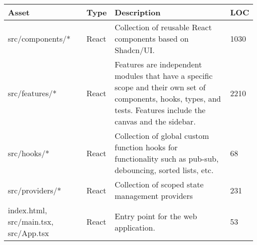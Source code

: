 \begin{table}[h]
    \centering


    \begin{tabular}{|p{5cm}|p{1.5cm}|p{6cm}|p{1cm}|}
        \hline
        \rowcolor{white} %
        \textbf{Asset}                        & \textbf{Type} & \textbf{Description}                                                                                                                                               & \textbf{LOC} \\
        \hline
        \rowcolor{reactLight}
        src/components/*                      & React         & Collection of reusable React components based on Shadcn/UI.                                                                                                        & 1030         \\
        \hline
        \rowcolor{reactLight}
        src/features/*                        & React         & Features are independent modules that have a specific scope and their own set of components, hooks, types, and tests. Features include the canvas and the sidebar. & 2210         \\
        \hline
        \rowcolor{reactLight}
        src/hooks/*                           & React         & Collection of global custom function hooks for functionality such as pub-sub, debouncing, sorted lists, etc.                                                       & 68           \\
        \hline
        \rowcolor{reactLight}
        src/providers/*                       & React         & Collection of scoped state management providers                                                                                                                    & 231          \\
        \hline
        \rowcolor{reactLight}
        index.html, src/main.tsx, src/App.tsx & React         & Entry point for the web application.                                                                                                                               & 53           \\


\end{tabular}
\end{table}
